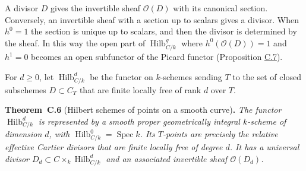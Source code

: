 \documentclass[11pt]{article}
\newenvironment{bpstatement}[2]{\par\addvspace{0.6\baselineskip}\noindent\textbf{#1}#2\textbf{.}\enspace\ignorespaces}
  {\par\addvspace{0.4\baselineskip}}
\newenvironment{bpstatementit}[2]{\begin{bpstatement}{#1}{#2}\itshape\ignorespaces}{\end{bpstatement}}
\begin{document}
A divisor \(D\) gives the invertible sheaf \(\mathcal O(D)\) with its canonical section. Conversely, an invertible sheaf with a section up to scalars gives a divisor. When \(h^0=1\) the section is unique up to scalars, and then the divisor is determined by the sheaf. In this way the open part of \(\operatorname{Hilb}^{g}_{C/k}\) where \(h^0(\mathcal O(D))=1\) and \(h^1=0\) becomes an open subfunctor of the Picard functor (Proposition \hyperref[bp142]{C.7}).

For \(d\geq0\), let \(\operatorname{Hilb}^d_{C/k}\) be the functor on \(k\)-schemes sending \(T\) to the set of closed subschemes \(D\subset C_T\) that are finite locally free of rank \(d\) over \(T\).

\label{bp139}%
\begin{bpstatementit}{Theorem~C.6}{ (Hilbert schemes of points on a smooth curve)}
The functor \(\operatorname{Hilb}^{d}_{C/k}\) is represented by a smooth proper geometrically integral \(k\)-scheme of dimension \(d\), with \(\operatorname{Hilb}^{0}_{C/k}=\operatorname{Spec}k\). Its \(T\)-points are precisely the relative effective Cartier divisors that are finite locally free of degree \(d\). It has a universal divisor \(D_d\subset C\times_k\operatorname{Hilb}^{d}_{C/k}\) and an associated invertible sheaf \(\mathcal O(D_d)\).
\end{bpstatementit}
\end{document}
